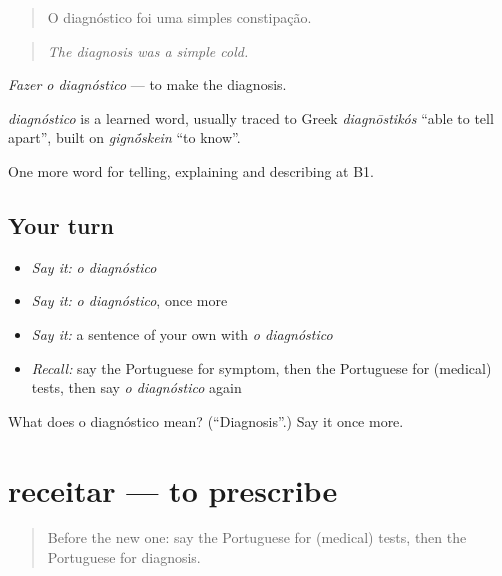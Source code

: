 \begin{quote}
O diagnóstico foi uma simples constipação.
\end{quote}

\begin{quote}
\emph{The diagnosis was a simple cold.}
\end{quote}

\emph{Fazer o diagnóstico} — to make the diagnosis.

\begin{cousinweb}
\emph{diagnóstico} is a learned word, usually traced to Greek \emph{diagnōstikós} \textquotedblleft{}able to tell apart\textquotedblright{}, built on \emph{gign\'{\={o}}skein} \textquotedblleft{}to know\textquotedblright{}.
\end{cousinweb}

\begin{grammarlens}[title={What you've built}]
One more word for telling, explaining and describing at B1.
\end{grammarlens}

\subsection*{Your turn}
\begin{itemize}
\raggedright
  \item \emph{Say it:} \emph{o diagnóstico}
  \item \emph{Say it:} \emph{o diagnóstico}, once more
  \item \emph{Say it:} a sentence of your own with \emph{o diagnóstico}
  \item \emph{Recall:} say the Portuguese for symptom, then the Portuguese for (medical) tests, then say \emph{o diagnóstico} again
\end{itemize}

\begin{tcolorbox}[breakable,colback=teal!4,colframe=teal!35!black,title={Before you move on}]
What does o diagnóstico mean? (\textquotedblleft{}Diagnosis\textquotedblright{}.) Say it once more.
\end{tcolorbox}
\section[receitar]{receitar — to prescribe}

\label{lesson:PT-C487-receitar}



\begin{quote}
Before the new one: say the Portuguese for (medical) tests, then the Portuguese for diagnosis.
\end{quote}

